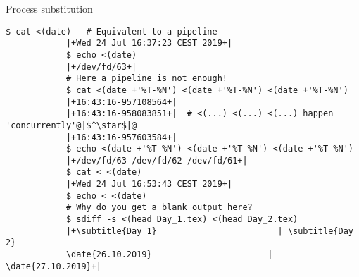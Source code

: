 \begin{frame}[fragile]{Process substitution}
\begin{onlyenv}
\begin{lstlisting}[style=MyBash, xleftmargin=2mm, xrightmargin=0mm]
            $ cat <(date)   # Equivalent to a pipeline
            |+Wed 24 Jul 16:37:23 CEST 2019+|
            $ echo <(date)
            |+/dev/fd/63+|
            # Here a pipeline is not enough!
            $ cat <(date +'%T-%N') <(date +'%T-%N') <(date +'%T-%N')
            |+16:43:16-957108564+|
            |+16:43:16-958083851+|  # <(...) <(...) <(...) happen 'concurrently'@|$^\star$|@
            |+16:43:16-957603584+|
            $ echo <(date +'%T-%N') <(date +'%T-%N') <(date +'%T-%N')
            |+/dev/fd/63 /dev/fd/62 /dev/fd/61+|
            $ cat < <(date)
            |+Wed 24 Jul 16:53:43 CEST 2019+|
            $ echo < <(date)
            # Why do you get a blank output here?
            $ sdiff -s <(head Day_1.tex) <(head Day_2.tex)
            |+\subtitle{Day 1}                        | \subtitle{Day 2}
            \date{26.10.2019}                       | \date{27.10.2019}+|
        \end{lstlisting}
    \end{onlyenv}
\end{frame}
